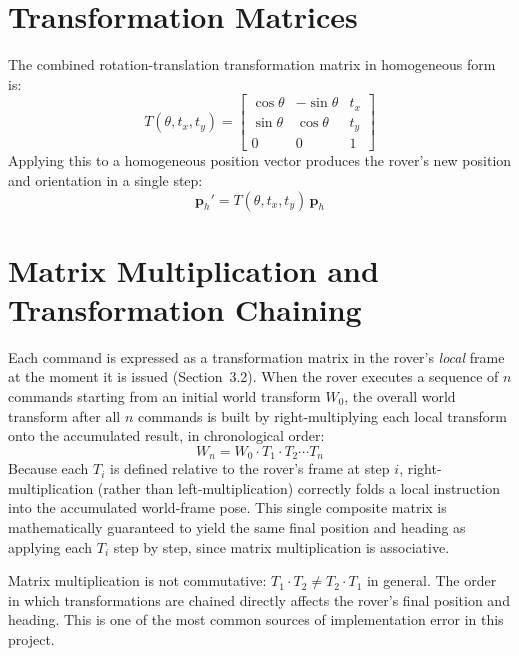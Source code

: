 \documentclass[12pt]{report}
\begin{document}
\section{Transformation Matrices}
The combined rotation-translation transformation matrix in homogeneous form is:
\begin{equation}
T(\theta, t_x, t_y) =
\begin{bmatrix}
\cos\theta & -\sin\theta & t_x \\
\sin\theta & \cos\theta & t_y \\
0 & 0 & 1
\end{bmatrix}
\end{equation}
Applying this to a homogeneous position vector produces the rover's new position and orientation in a single step:
\begin{equation}
\mathbf{p}_h' = T(\theta, t_x, t_y)\, \mathbf{p}_h
\end{equation}

\section{Matrix Multiplication and Transformation Chaining}
Each command is expressed as a transformation matrix in the rover's \emph{local} frame at the moment it is issued (Section~3.2). When the rover executes a sequence of $n$ commands starting from an initial world transform $W_0$, the overall world transform after all $n$ commands is built by right-multiplying each local transform onto the accumulated result, in chronological order:
\begin{equation}
W_n = W_0 \cdot T_1 \cdot T_2 \cdots T_n
\end{equation}
Because each $T_i$ is defined relative to the rover's frame at step $i$, right-multiplication (rather than left-multiplication) correctly folds a local instruction into the accumulated world-frame pose. This single composite matrix is mathematically guaranteed to yield the same final position and heading as applying each $T_i$ step by step, since matrix multiplication is associative.
\begin{infobox}[title=Critical Detail]
Matrix multiplication is not commutative: $T_1 \cdot T_2 \neq T_2 \cdot T_1$ in general. The order in which transformations are chained directly affects the rover's final position and heading. This is one of the most common sources of implementation error in this project.
\end{infobox}
\end{document}
